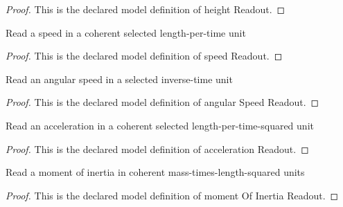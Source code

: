 \begin{proof}
  This is the declared model definition of height Readout.
\end{proof}
\begin{definition}
  \label{def:physics:phyx-mini-0713:phyxminiproblems-problemphyxmini0713-speedreadout}
  Read a speed in a coherent selected length-per-time unit
\end{definition}
\begin{proof}
  This is the declared model definition of speed Readout.
\end{proof}
\begin{definition}
  \label{def:physics:phyx-mini-0713:phyxminiproblems-problemphyxmini0713-angularspeedreadout}
  Read an angular speed in a selected inverse-time unit
\end{definition}
\begin{proof}
  This is the declared model definition of angular Speed Readout.
\end{proof}
\begin{definition}
  \label{def:physics:phyx-mini-0713:phyxminiproblems-problemphyxmini0713-accelerationreadout}
  Read an acceleration in a coherent selected length-per-time-squared unit
\end{definition}
\begin{proof}
  This is the declared model definition of acceleration Readout.
\end{proof}
\begin{definition}
  \label{def:physics:phyx-mini-0713:phyxminiproblems-problemphyxmini0713-momentofinertiareadout}
  Read a moment of inertia in coherent mass-times-length-squared units
\end{definition}
\begin{proof}
  This is the declared model definition of moment Of Inertia Readout.
\end{proof}
